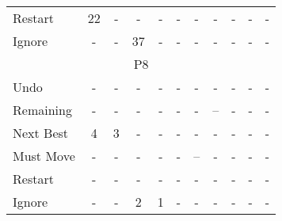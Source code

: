 \begin{table}[tpb]
{\begin{tabular}{|l|cccccccccc|}
Restart & 22 & - & - & - & - & - & - & - & - & - \\ \cline{1-1}
Ignore & - & - & 37 & - & - & - & - & - & - & - \\ \hline
\multicolumn{11}{|c|}{P8} \\ \hline
Undo & - & - & - & - & - & - & - & - & - & - \\ \cline{1-1}
Remaining & - & - & - & - & - & - & -- & - & - & - \\ \cline{1-1}
Next Best & 4 & 3 & - & - & - & - & - & - & - & - \\ \cline{1-1}
Must Move & - & - & - & - & - & -- & - & - & - & - \\ \cline{1-1}
Restart & - & - & - & - & - & - & - & - & - & - \\ \cline{1-1}
Ignore & - & - & 2 & 1 & - & - & - & - & - & - \\ \hline
\end{tabular}%
}
\end{table}

